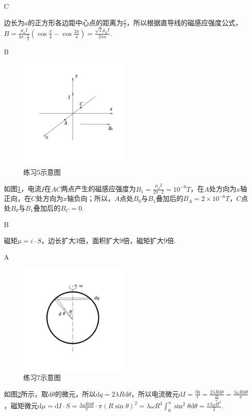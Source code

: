 \documentclass[b5paper,opensource,sourcefont,parskip]{qyxf-book}
\newcommand{\di}[1]{\mathrm{d}#1}
\begin{document}
C

\solve
边长为$a$的正方形各边距中心点的距离为$\frac{a}{2}$，所以根据直导线的磁感应强度公式，$B=\frac{\mu_0I}{4\pi\cdot\frac{a}{2}}(\cos\frac{\pi}{4}-\cos\frac{3\pi}{4})=\frac{\sqrt{2}\mu_0I}{2\pi a}$.

B

\begin{figure}[htbp]  %
	\centering
	\includegraphics[width=15em, height=15em]{Chp8_illus1.jpg}
	\caption{练习5示意图}
	\label{fig:c8-t5}
\end{figure}

\solve
如图\ref{fig:c8-t5}，电流$I$在$AC$两点产生的磁感应强度为$B_1=\frac{\mu_0I}{2\pi\cdot2}=10^{-6}T$，在$A$处方向为$x$轴正向，在$C$处方向为$x$轴负向；所以，$A$点处$B_0$与$B_1$叠加后的$B_A=2\times10^{-6}T$，$C$点处$B_0$与$B_1$叠加后的$B_C=0$.

B

\solve
磁矩$\mu=i\cdot S$，边长扩大3倍，面积扩大9倍，磁矩扩大9倍.

A

\begin{figure}[htbp]  %
	\centering
	\includegraphics[width=15em, height=15em]{Chp8_illus2.jpg}
	\caption{练习7示意图}\label{fig:c8-t7}
\end{figure}

\solve
如图\ref{fig:c8-t7}所示，取$\di\theta$的微元，所以$\di q=2\lambda R\di\theta$，所以电流微元$\di I=\frac{\di q}{t}=\frac{2\lambda R\di\theta}{\frac{2\pi}{\omega}}=\frac{\lambda\omega R\di\theta}{\pi}$，磁矩微元$\di\mu=\di I\cdot S=\frac{\lambda\omega R\di\theta}{\pi}\cdot\pi(R\sin\theta)^2=\lambda\omega R^3\int_0^\pi\sin^2\theta\di\theta=\frac{\pi\lambda\omega R^3}{2}$.
\end{document}
